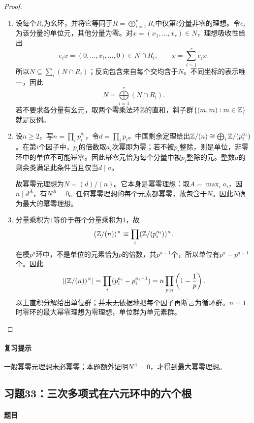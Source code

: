 \begin{proof}

\begin{enumerate}
\item 设每个$R_i$为幺环，并将它等同于$R=\bigoplus\limits_{i=1}^rR_i$中仅第$i$分量非零的理想。令$e_i$为该分量的单位元，其他分量为零。对$x=(x_1,\ldots,x_r)\in N$，理想吸收性给出
\[
e_ix=(0,\ldots,x_i,\ldots,0)\in N\cap R_i,\qquad
x=\sum_{i=1}^r e_ix.
\]
所以$N\subseteq\sum_i(N\cap R_i)$；反向包含来自每个交均含于$N$。不同坐标的表示唯一，因此
\[
N=\bigoplus\limits_{i=1}^r(N\cap R_i).
\]
若不要求各分量有幺元，取两个零乘法环$\mathbb Z$的直和，斜子群$\{(m,m):m\in\mathbb Z\}$就是反例。
\item 设$n\ge2$，写$n=\prod_i p_i^{a_i}$，令$d=\prod_i p_i$。中国剩余定理给出$\mathbb Z/(n)\cong\bigoplus_i\mathbb Z/(p_i^{a_i})$。在第$i$个因子中，$p_i$的倍数取$a_i$次幂即为零；若不被$p_i$整除，则是单位，非零环中的单位不可能幂零。因此幂零元恰为每个分量中被$p_i$整除的元。整数$a$的剩余类满足此条件当且仅当$d\mid a$。

故幂零元理想为$N=(d)/(n)$。它本身是幂零理想：取$A=\max_i a_i$，因$n\mid d^A$，有$N^A=0$。任何幂零理想的每个元素都幂零，故包含于$N$。因此$N$确为最大的幂零理想。
\item 分量乘积为$1$等价于每个分量乘积为$1$，故
\[
(\mathbb Z/(n))^\times\cong\prod_i(\mathbb Z/(p_i^{a_i}))^\times.
\]
在模$p^a$环中，不是单位的元素恰为$p$的倍数，共$p^{a-1}$个，所以单位有$p^a-p^{a-1}$个。因此
\[
|(\mathbb Z/(n))^\times|=\prod_i(p_i^{a_i}-p_i^{a_i-1})
=n\prod_{p\mid n}\left(1-\frac1p\right).
\]
以上直积分解给出单位群；并未无依据地把每个因子再断言为循环群。$n=1$时零环的最大幂零理想为零理想，单位群为单元素群。
\end{enumerate}

\end{proof}

\paragraph{复习提示}

一般幂零元理想未必幂零；本题额外证明$N^A=0$，才得到最大幂零理想。



\subsection{习题33：三次多项式在六元环中的六个根}

\label{ex:3:33}

\paragraph{题目}

